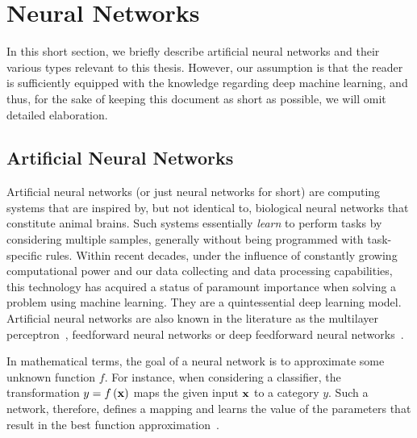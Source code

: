 \section{Neural Networks}

In this short section, we briefly describe artificial neural networks and their various types relevant to this thesis. However, our assumption is that the reader is sufficiently equipped with the knowledge regarding deep machine learning, and thus, for the sake of keeping this document as short as possible, we will omit detailed elaboration.

\subsection{Artificial Neural Networks}
\label{ssec:ArtificialNeuralNetworks}

Artificial neural networks (or just neural networks for short) are computing systems that are inspired by, but not identical to, biological neural networks that constitute animal brains. Such systems essentially \emph{learn} to perform tasks by considering multiple samples, generally without being programmed with task-specific rules. Within recent decades, under the influence of constantly growing computational power and our data collecting and data processing capabilities, this technology has acquired a status of paramount importance when solving a problem using machine learning. They are a quintessential deep learning model. Artificial neural networks are also known in the literature as the multilayer perceptron~\cite{Rosenblatt1958ThePA}, feedforward neural networks or deep feedforward neural networks~\cite{Goodfellow-et-al-2016}.

In mathematical terms, the goal of a neural network is to approximate some unknown function $f$. For instance, when considering a classiﬁer, the transformation $y = {f} \left( {\mathbf{x}} \right)$  maps the given input ${\mathbf{x}}$ to a category $y$. Such a network, therefore, defines a mapping and learns the value of the parameters that result in the best function approximation~\cite{Goodfellow-et-al-2016}.

